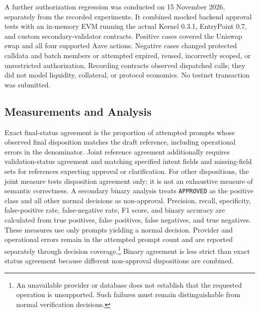 A further authorization regression was conducted on 15 November 2026,
separately from the recorded experiments. It combined mocked backend
approval tests with an in-memory EVM running the actual Kernel 0.3.1,
EntryPoint 0.7, and custom secondary-validator contracts. Positive cases
covered the Uniswap swap and all four supported Aave actions. Negative
cases changed protected calldata and batch members or attempted expired,
reused, incorrectly scoped, or unrestricted authorization. Recording
contracts observed dispatched calls; they did not model liquidity,
collateral, or protocol economics. No testnet transaction was submitted.

\subsection{Measurements and Analysis}
\label{sec:evaluation_measurements}

Exact final-status agreement is the proportion of attempted prompts whose
observed final disposition matches the draft reference, including operational
errors in the denominator. Joint reference agreement additionally requires
validation-status agreement and matching specified intent fields and
missing-field sets for references expecting approval or clarification. For
other dispositions, the joint measure tests disposition agreement only; it
is not an exhaustive measure of semantic correctness. A secondary binary analysis treats \texttt{APPROVED} as the positive class
and all other normal decisions as non-approval. Precision, recall,
specificity, false-positive rate, false-negative rate, F1 score, and binary
accuracy are calculated from true positives, false positives, false
negatives, and true negatives. These measures use only prompts yielding a
normal decision. Provider and operational errors remain in the attempted
prompt count and are reported separately through decision coverage.\footnote{
An unavailable provider or database does not establish that the requested
operation is unsupported. Such failures must remain distinguishable from
normal verification decisions.} Binary agreement is less strict than exact
status agreement because different non-approval dispositions are combined.

